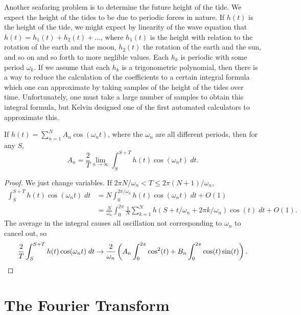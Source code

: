 Another seafaring problem is to determine the future height of the tide. We expect the height of the tides to be due to periodic forces in nature. If $h(t)$ is the height of the tide, we might expect by linearity of the wave equation that $h(t) = h_1(t) + h_2(t) + \dots$, where $h_1(t)$ is the height with relation to the rotation of the earth and the moon, $h_2(t)$ the rotation of the earth and the sun, and so on and so forth to more neglible values. Each $h_k$ is periodic with some period $\omega_k$. If we assume that each $h_k$ is a trigonometric polynomial, then there is a way to reduce the calculation of the coefficients to a certain integral formula which one can approximate by taking samples of the height of the tides over time. Unfortunately, one must take a large number of samples to obtain this integral formula, but Kelvin designed one of the first automated calculators to approximate this.

\begin{theorem}
	If $h(t) = \sum_{n = 1}^N A_n \cos(\omega_n t)$, where the $\omega_n$ are all different periods, then for any $S$,
	\[ A_n = \frac{2}{T} \lim_{n \to \infty} \int_S^{S + T} h(t) \cos(\omega_n t)\; dt. \]
\end{theorem}
\begin{proof}
	We just change variables. If $2 \pi N / \omega_n < T \leq 2 \pi (N + 1)/\omega_n$,
	\begin{align*}
		\int_S^{S+T} h(t) \cos(\omega_n t)\; dt &= N \int_0^{2 \pi/ \omega_n} h(t) \cos(\omega_n t)\; dt + O(1)\\
		&= \frac{N}{\omega_n} \int_0^{2 \pi} \frac{1}{N} \sum_{k = 1}^N h(S + t/\omega_n + 2 \pi k / \omega_n) \cos(t)\; dt + O(1).
	\end{align*}
	The average in the integral causes all oscillation not corresponding to $\omega_n$ to cancel out, so
	\[ \frac{2}{T} \int_S^{S+T} h(t) \cos(\omega_n t)\; dt \to \frac{2}{\omega_n} \left( A_n \int_0^{2\pi} \cos^2(t) + B_n \int_0^{2\pi} \cos(t) \sin(t) \right). \qedhere \]
\end{proof}








\chapter{The Fourier Transform}

